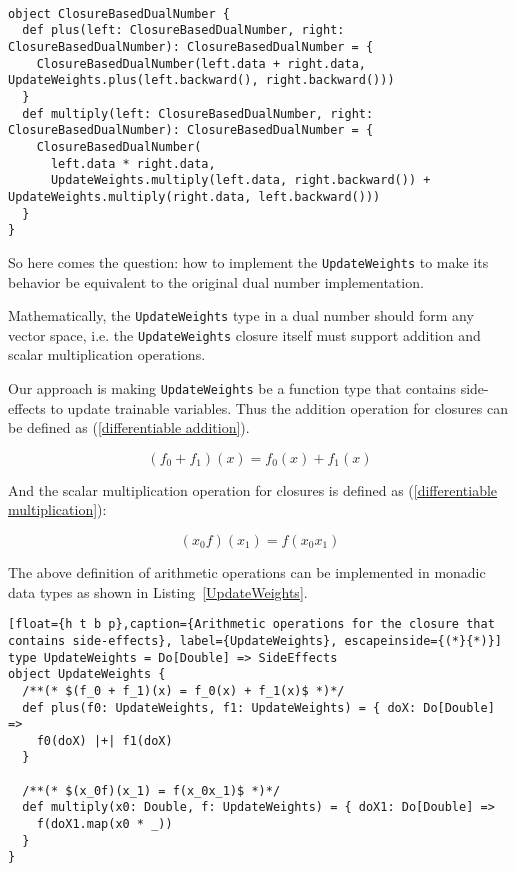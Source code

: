 \begin{lstlisting}[float={h t b p},caption={Replacing operations on \lstinline{PartialDelta} to custom functions for \lstinline{UpdateWeights}}, label={object ClosureBasedDualNumber}]  

object ClosureBasedDualNumber {
  def plus(left: ClosureBasedDualNumber, right: ClosureBasedDualNumber): ClosureBasedDualNumber = {
    ClosureBasedDualNumber(left.data + right.data, UpdateWeights.plus(left.backward(), right.backward()))
  }
  def multiply(left: ClosureBasedDualNumber, right: ClosureBasedDualNumber): ClosureBasedDualNumber = {
    ClosureBasedDualNumber(
      left.data * right.data,
      UpdateWeights.multiply(left.data, right.backward()) + UpdateWeights.multiply(right.data, left.backward()))
  }
}
\end{lstlisting}

So here comes the question: how to implement the \lstinline{UpdateWeights} to make its behavior be equivalent to the original dual number implementation.

Mathematically, the \lstinline{UpdateWeights} type in a dual number should form any vector space, i.e. the \lstinline{UpdateWeights} closure itself must support addition and scalar multiplication operations.

Our approach is making \lstinline{UpdateWeights} be a function type that contains side-effects to update \glspl{trainable variable}.  Thus the addition operation for closures can be defined as (\ref{differentiable addition}).

\begin{equation}
\label{differentiable addition}
(f_0 + f_1)(x) = f_0(x) + f_1(x)
\end{equation}

And the scalar multiplication operation for closures is defined as (\ref{differentiable multiplication}):

\begin{equation}
\label{differentiable multiplication}
(x_0f)(x_1) = f(x_0x_1)
\end{equation}

The above definition of arithmetic operations can be implemented in monadic data types as shown in Listing~\ref{UpdateWeights}.

\begin{lstlisting}[float={h t b p},caption={Arithmetic operations for the closure that contains side-effects}, label={UpdateWeights}, escapeinside={(*}{*)}]
type UpdateWeights = Do[Double] => SideEffects
object UpdateWeights {
  /**(* $(f_0 + f_1)(x) = f_0(x) + f_1(x)$ *)*/
  def plus(f0: UpdateWeights, f1: UpdateWeights) = { doX: Do[Double] =>
    f0(doX) |+| f1(doX)
  }

  /**(* $(x_0f)(x_1) = f(x_0x_1)$ *)*/
  def multiply(x0: Double, f: UpdateWeights) = { doX1: Do[Double] =>
    f(doX1.map(x0 * _))
  }
}
\end{lstlisting}


